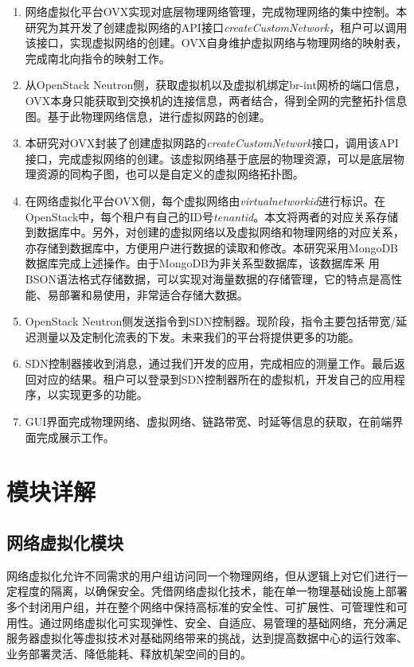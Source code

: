 \begin{enumerate}
\item 网络虚拟化平台OVX实现对底层物理网络管理，完成物理网络的集中控制。本研究为其开发了创建虚拟网络的API接口\emph{createCustomNetwork}，租户可以调用该接口，实现虚拟网络的创建。OVX自身维护虚拟网络与物理网络的映射表，完成南北向指令的映射工作。
\item 从OpenStack Neutron侧，获取虚拟机以及虚拟机绑定br-int网桥的端口信息，OVX本身只能获取到交换机的连接信息，两者结合，得到全网的完整拓扑信息图。基于此物理网络信息，进行虚拟网路的创建。
\item 本研究对OVX封装了创建虚拟网路的\emph{createCustomNetwork}接口，调用该API接口，完成虚拟网络的创建。该虚拟网络基于底层的物理资源，可以是底层物理资源的同构子图，也可以是自定义的虚拟网络拓扑图。
\item 在网络虚拟化平台OVX侧，每个虚拟网络由\emph{virtualnetworkid}进行标识。在OpenStack中，每个租户有自己的ID号\emph{tenantid}。本文将两者的对应关系存储到数据库中。另外，对创建的虚拟网络以及虚拟网络和物理网络的对应关系，亦存储到数据库中，方便用户进行数据的读取和修改。本研究采用MongoDB数据库完成上述操作。由于MongoDB为非关系型数据库，该数据库釆
用BSON语法格式存储数据，可以实现对海量数据的存储管理，它的特点是高性能、易部署和易使用，非常适合存储大数据\cite{mongodb}。

\item OpenStack Neutron侧发送指令到SDN控制器。现阶段，指令主要包括带宽/延迟测量以及定制化流表的下发。未来我们的平台将提供更多的功能。
\item SDN控制器接收到消息，通过我们开发的应用，完成相应的测量工作。最后返回对应的结果。租户可以登录到SDN控制器所在的虚拟机，开发自己的应用程序，以实现更多的功能。
\item GUI界面完成物理网络、虚拟网络、链路带宽、时延等信息的获取，在前端界面完成展示工作。
\end{enumerate}

\section{模块详解}
\subsection{网络虚拟化模块}
网络虚拟化允许不同需求的用户组访问同一个物理网络，但从逻辑上对它们进行一定程度的隔离，以确保安全。凭借网络虚拟化技术，能在单一物理基础设施上部署多个封闭用户组，并在整个网络中保持高标准的安全性、可扩展性、可管理性和可用性。通过网络虚拟化可实现弹性、安全、自适应、易管理的基础网络，充分满足服务器虚拟化等虚拟技术对基础网络带来的挑战，达到提高数据中心的运行效率、业务部署灵活、降低能耗、释放机架空间的目的。

